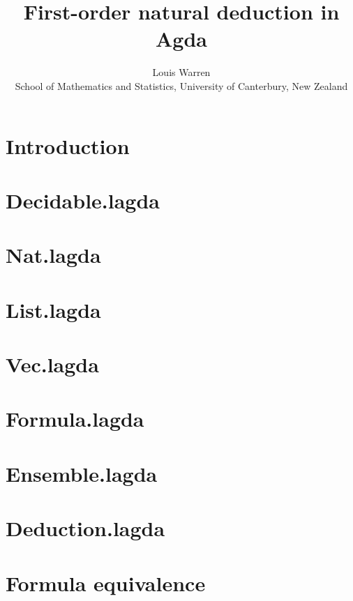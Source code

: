 \documentclass{article}
\theoremstyle{definition}
\theoremstyle{plain}
\begin{document}
\title{First-order natural deduction in Agda}
\author{
Louis Warren \\
School of Mathematics and Statistics, University of Canterbury, New Zealand
}
\date{}
\maketitle

\tableofcontents

\section{Introduction}


\section{Decidable.lagda}


\section{Nat.lagda}


\section{List.lagda}


\section{Vec.lagda}


\section{Formula.lagda}


\section{Ensemble.lagda}


\section{Deduction.lagda}


\section{Formula equivalence}

\end{document}

